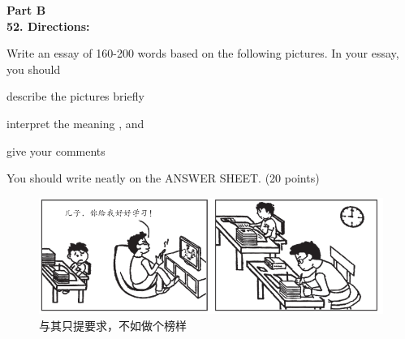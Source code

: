 \vspace{2em}

\noindent
\textbf{Part B}\\
\textbf{ 52. Directions:}

Write an essay of 160-200 words based on the following pictures. In
your essay, you should
\begin{listwrite}
	\item
 describe the pictures briefly

\item 
 interpret the meaning , and

\item 
 give your comments
\end{listwrite}

You should write neatly on the ANSWER SHEET. (20 points)


\begin{figure}[h!]
	\centering
	\includegraphics[width=0.87\linewidth]{picture/2016.png}
	\caption*{与其只提要求，不如做个榜样}
\end{figure}


\checkpagenumber